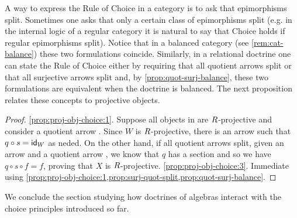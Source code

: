 A way to express  the Rule of Choice in a category is to ask that epimorphisms split. Sometimes one asks that only a certain class of epimorphisms split (e.g. in the internal logic of a regular category it is natural to say that Choice holds if regular epimorphisms split). 
 Notice that  in a balanced category (see \cref{rem:cat-balance}) these two formulations coincide. %
Similarly, in a relational doctrine one can state the Rule of Choice either by requiring that all quotient arrows split or that all surjective arrows split 
and, by \cref{prop:quot-surj-balance}, these two formulations are equivalent when the doctrine is balanced. 
The next proposition relates  these concepts to projective objects. 
\begin{proof}
\cref{prop:proj-obj-choice:1}. 
Suppose all objects in \CC are $R$-projective and consider a quotient arrow . 
Since $W$ is $R$-projective, there is an arrow  such that $q\circ s = \mathsf{id}_W$ as neded. 
On the other hand, if all quotient arrows split, given an arrow  and a quotient arrow , we know that $q$ has a section  and so we have $q\circ s \circ f = f$, proving that $X$ is $R$-projective. \cref{prop:proj-obj-choice:3}. 
Immediate using \cref{prop:proj-obj-choice:1,prop:surj-quot-split,prop:quot-surj-balance}. 
\end{proof}

We conclude the section studying how doctrines of algebras interact with the choice principles introduced so far.

